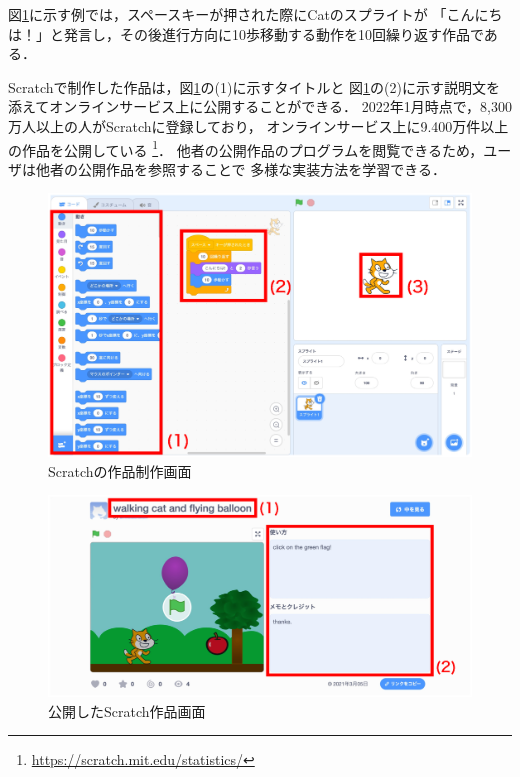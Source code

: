 \documentclass[11pt]{jreport}
\begin{document}
図\ref{scratchdisplay}に示す例では，スペースキーが押された際にCatのスプライトが
「こんにちは！」と発言し，その後進行方向に10歩移動する動作を10回繰り返す作品である．

Scratchで制作した作品は，図\ref{scratchdisplay}の(1)に示すタイトルと
図\ref{scratchdisplay}の(2)に示す説明文を添えてオンラインサービス上に公開することができる．
2022年1月時点で，8,300万人以上の人がScratchに登録しており，
オンラインサービス上に9.400万件以上の作品を公開している
\footnote{\url{https://scratch.mit.edu/statistics/}}．
他者の公開作品のプログラムを閲覧できるため，ユーザは他者の公開作品を参照することで
多様な実装方法を学習できる\cite{spfa}．

\begin{figure}[H]
    \centering
    \includegraphics[width=12cm]{scratch_display.eps}
    \caption{Scratchの作品制作画面}
    \label{scratchdisplay}
\end{figure}

\begin{figure}[H]
    \centering
    \includegraphics[width=15cm]{scratch_online.eps}
    \caption{公開したScratch作品画面}
    \label{scratchonline}
\end{figure}
\end{document}

